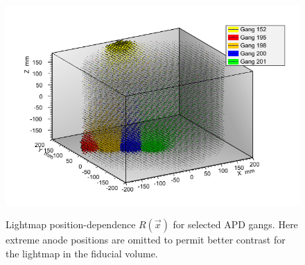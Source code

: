 \begin{figure}
\begin{center}
\includegraphics[keepaspectratio=true,width=\textwidth]{Lightmap_viz_zoom.png}
\end{center}
\renewcommand{\baselinestretch}{1}
\small\normalsize
\begin{quote}
\caption{Lightmap position-dependence $R(\vec{x})$ for selected APD gangs.  Here extreme anode positions are omitted to permit better contrast for the lightmap in the fiducial volume.}
\label{fig:Lightmap3DPlot_zoomed}
\end{quote}
\end{figure}
\renewcommand{\baselinestretch}{2}
\small\normalsize

